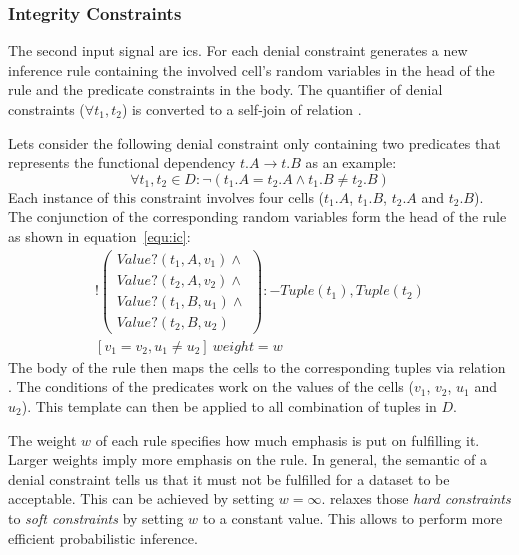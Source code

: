   \subsubsection*{Integrity Constraints}
  The second input signal are \glspl{ic}.
  For each denial constraint \holoclean{} generates a new inference rule containing the involved cell's random variables in the head of the rule and the predicate constraints in the body.
  The quantifier of denial constraints ($\forall t_1, t_2$) is converted to a self-join of relation .
  
  Lets consider the following denial constraint only containing two predicates that represents the functional dependency $t.A \to t.B$ as an example:
  \begin{equation}
    \forall t_1, t_2 \in D: \neg(t_1.A = t_2.A \land t_1.B \neq t_2.B)
  \end{equation}
  Each instance of this constraint involves four cells ($t_1.A$, $t_1.B$, $t_2.A$ and $t_2.B$).
  The conjunction of the corresponding random variables form the head of the \ddlog{} rule as shown in equation~\ref{equ:ic}:
  \begin{multline}
    !
    \begin{pmatrix}
      Value?(t_1,A,v_1) \land\\
      Value?(t_2,A,v_2) \land\\
      Value?(t_1,B,u_1) \land\\
      Value?(t_2,B,u_2)
    \end{pmatrix}
    :- Tuple(t_1),Tuple(t_2)\\
    [v_1 = v_2, u_1 \neq u_2]\ weight=w\label{equ:ic}
  \end{multline}
  The body of the rule then maps the cells to the corresponding tuples via relation .
  The conditions of the predicates work on the values of the cells ($v_1$, $v_2$, $u_1$ and $u_2$).
  This template can then be applied to all combination of tuples in $D$.
  
  The weight $w$ of each rule specifies how much emphasis is put on fulfilling it.
  Larger weights imply more emphasis on the rule.
  In general, the semantic of a denial constraint tells us that it must not be fulfilled for a dataset to be acceptable.
  This can be achieved by setting $w=\infty$.
  \holoclean{} relaxes those \textit{hard constraints} to \textit{soft constraints} by setting $w$ to a constant value.
  This allows \holoclean{} to perform more efficient probabilistic inference.
  
